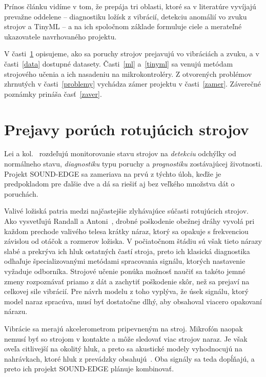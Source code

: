 \documentclass[10pt,twoside,slovak,a4paper]{article}
\begin{document}
Prínos článku vidíme v tom, že prepája tri oblasti, ktoré sa v literatúre vyvíjajú prevažne oddelene -- diagnostiku ložísk z vibrácií, detekciu anomálií vo zvuku strojov a TinyML -- a na ich spoločnom základe formuluje ciele a merateľné ukazovatele navrhovaného projektu.

V časti~\ref{prejavy} opisujeme, ako sa poruchy strojov prejavujú vo vibráciách a zvuku, a v časti~\ref{data} dostupné datasety. Časti~\ref{ml} a~\ref{tinyml} sa venujú metódam strojového učenia a ich nasadeniu na mikrokontroléry. Z otvorených problémov zhrnutých v časti~\ref{problemy} vychádza zámer projektu v časti~\ref{zamer}. Záverečné poznámky prináša časť~\ref{zaver}.



\section{Prejavy porúch rotujúcich strojov} \label{prejavy}

Lei a kol.~\cite{lei2020} rozdeľujú monitorovanie stavu strojov na \emph{detekciu} odchýlky od normálneho stavu, \emph{diagnostiku} typu poruchy a \emph{prognostiku} zostávajúcej životnosti. Projekt SOUND-EDGE sa zameriava na prvú z týchto úloh, keďže je predpokladom pre ďalšie dve a dá sa riešiť aj bez veľkého množstva dát o poruchách.

Valivé ložiská patria medzi najčastejšie zlyhávajúce súčasti rotujúcich strojov. Ako vysvetľujú Randall a Antoni~\cite{randall2011}, drobné poškodenie obežnej dráhy vyvolá pri každom prechode valivého telesa krátky náraz, ktorý sa opakuje s frekvenciou závislou od otáčok a rozmerov ložiska. V počiatočnom štádiu sú však tieto nárazy slabé a prekrýva ich hluk ostatných častí stroja, preto ich klasická diagnostika odhaľuje špecializovanými metódami spracovania signálu, ktorých nastavenie vyžaduje odborníka. Strojové učenie ponúka možnosť naučiť sa takéto jemné zmeny rozpoznávať priamo z dát a zachytiť poškodenie skôr, než sa prejaví na celkovej sile vibrácií. Pre návrh modelu z toho vyplýva, že úsek signálu, ktorý model naraz spracúva, musí byť dostatočne dlhý, aby obsahoval viacero opakovaní nárazu.

Vibrácie sa merajú akcelerometrom pripevneným na stroj. Mikrofón naopak nemusí byť so strojom v kontakte a môže sledovať viac strojov naraz. Je však oveľa citlivejší na okolitý hluk, a preto sa akustické modely vyhodnocujú na nahrávkach, ktoré hluk z prevádzky obsahujú~\cite{koizumi2020dcase}. Oba signály sa teda dopĺňajú, a preto ich projekt SOUND-EDGE plánuje kombinovať.
\end{document}
